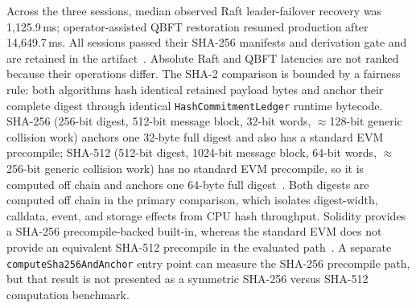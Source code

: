 \documentclass[journal]{IEEEtran}
\begin{document}
Across the three sessions, median observed Raft leader-failover recovery was
1{,}125.9\,ms; operator-assisted QBFT restoration resumed production after
14{,}649.7\,ms. All sessions passed their SHA-256 manifests and derivation
gate and are retained in the artifact~\cite{artifactRepo}. Absolute Raft and
QBFT latencies are not ranked because their operations differ.
The SHA-2 comparison is bounded by a fairness rule: both algorithms hash
identical retained payload bytes and anchor their complete digest through
identical \texttt{HashCommitmentLedger} runtime bytecode. SHA-256 (256-bit
digest, 512-bit message block, 32-bit words, $\approx$128-bit generic
collision work) anchors one 32-byte full digest and also has a standard EVM
precompile; SHA-512 (512-bit digest, 1024-bit message block, 64-bit words,
$\approx$256-bit generic collision work) has no standard EVM precompile, so it
is computed off chain and anchors one 64-byte full
digest~\cite{artifactRepo}. Both digests are computed off chain in the
primary comparison, which isolates digest-width, calldata, event, and storage
effects from CPU hash throughput. Solidity provides a SHA-256
precompile-backed built-in, whereas the standard EVM does not provide an
equivalent SHA-512 precompile in the evaluated path~\cite{artifactRepo}. A
separate \texttt{computeSha256AndAnchor} entry point can measure the SHA-256
precompile path, but that result is not presented as a symmetric SHA-256
versus SHA-512 computation benchmark.
\end{document}
